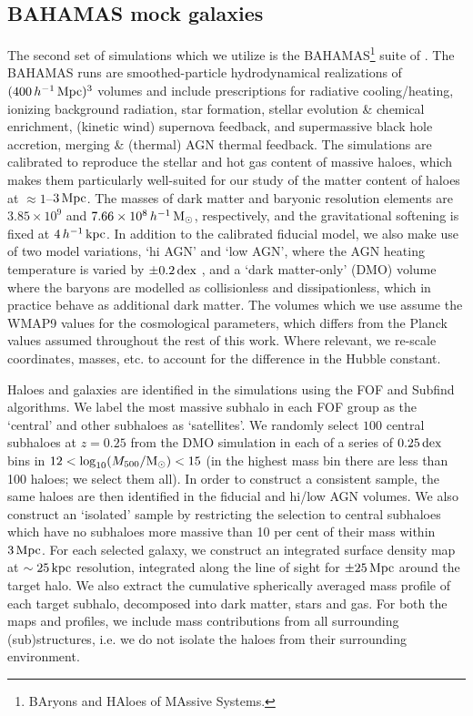 \documentclass[usenatbib]{mnras}
\newcommand{\dex}{\, {\rm dex}}
\begin{document}
\subsection{BAHAMAS mock galaxies}
\label{sec:bahamas_mocks}
The second set of simulations which we utilize is the BAHAMAS\footnote{BAryons and HAloes of MAssive Systems.} suite of \citet{mccarthy2017}. The BAHAMAS runs are smoothed-particle hydrodynamical realizations of $(400\,h^{-1}\,{\rm Mpc})^3$ volumes and include prescriptions for radiative cooling/heating, ionizing background radiation, star formation, stellar evolution \& chemical enrichment, (kinetic wind) supernova feedback, and supermassive black hole accretion, merging \& (thermal) AGN thermal feedback. The simulations are calibrated to reproduce the stellar and hot gas content of massive haloes, which makes them particularly well-suited for our study of the matter content of haloes at $\approx 1$--$3\,{\rm Mpc}$. The masses of dark matter and baryonic resolution elements are $3.85\times 10^9$ and $7.66\times 10^8\,h^{-1}\,{\rm M}_\odot$, respectively, and the gravitational softening is fixed at $4\,h^{-1}\,{\rm kpc}$. In addition to the calibrated fiducial model, we also make use of two model variations, `hi AGN' and `low AGN', where the AGN heating temperature is varied by $\pm0.2 \dex$ \citep{mccarthy2018}, and a `dark matter-only' (DMO) volume where the baryons are modelled as collisionless and dissipationless, which in practice behave as additional dark matter. The volumes which we use assume the WMAP9 values for the cosmological parameters, which differs from the Planck values assumed throughout the rest of this work. Where relevant, we re-scale coordinates, masses, etc. to account for the difference in the Hubble constant.


Haloes and galaxies are identified in the simulations using the FOF \citep{davis1985} and Subfind \citep{springel2001,dolag2009} algorithms. We label the most massive subhalo in each FOF group as the `central' and other subhaloes as `satellites'.  We randomly select $100$ central subhaloes at $z=0.25$ from the DMO simulation in each of a series of $0.25 \dex$ bins in $12 < \log_{10}(M_{500}/{\rm M}_\odot) < 15$ (in the highest mass bin there are less than 100 haloes; we select them all). In order to construct a consistent sample, the same haloes are then identified in the fiducial and hi/low AGN volumes. We also construct an `isolated' sample by restricting the selection to central subhaloes which have no subhaloes more massive than 10 per cent of their mass within $3\,{\rm Mpc}$. For each selected galaxy, we construct an integrated surface density map at $\sim 25\,{\rm kpc}$ resolution, integrated along the line of sight for $\pm 25\,{\rm Mpc}$ around the target halo. We also extract the cumulative spherically averaged mass profile of each target subhalo, decomposed into dark matter, stars and gas. For both the maps and profiles, we include mass contributions from all surrounding (sub)structures, i.e. we do not isolate the haloes from their surrounding environment.
\end{document}

